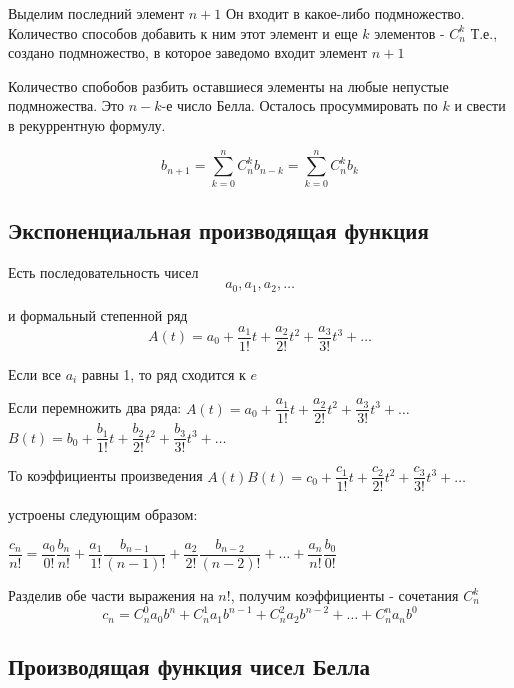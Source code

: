 Выделим последний элемент $ n+1 $
Он входит в какое-либо подмножество.
Количество способов добавить к ним этот элемент и еще $ k $ элементов - $ C_{n}^{k} $
Т.е., создано подмножество, в которое заведомо входит элемент $ n+1 $

Количество спобобов разбить оставшиеся элементы на любые непустые подмножества.
Это $ n-k$-е число Белла.
Осталось просуммировать по $ k $ и свести в рекуррентную формулу.

\begin{equation}
\label{bell_recur}
b_{n+1} = \sum\limits_{k = 0}^{n} C_{n}^{k} b_{n-k} = \sum\limits_{k = 0}^{n} C_{n}^{k} b_{k} 
\end{equation}

\subsection{Экспоненциальная производящая функция}

Есть последовательность чисел
$$
a_0, a_1, a_2, \ldots 
$$

и формальный степенной ряд
$$
A(t) = a_0 + \dfrac{a_1}{1!}t + \dfrac{a_2}{2!}t^{2} + \dfrac{a_3}{3!}t^{3} +\ldots 
$$

Если все $ a_i $ равны 1, то ряд сходится к $ e $

Если перемножить два ряда:
$A(t) = a_0 + \dfrac{a_1}{1!}t + \dfrac{a_2}{2!}t^{2} + \dfrac{a_3}{3!}t^{3} +\ldots $
$B(t) = b_0 + \dfrac{b_1}{1!}t + \dfrac{b_2}{2!}t^{2} + \dfrac{b_3}{3!}t^{3} +\ldots $

То коэффициенты произведения
$A(t) B(t) = c_0 + \dfrac{c_1}{1!}t + \dfrac{c_2}{2!}t^{2} + \dfrac{c_3}{3!}t^{3} +\ldots $

устроены следующим образом:

$\dfrac{c_n}{n!} = \dfrac{a_{0}}{0!}\dfrac{b_{n}}{n!}
+ \dfrac{a_{1}}{1!} \dfrac{b_{n-1}}{(n-1)!} 
+ \dfrac{a_{2}}{2!} \dfrac{b_{n-2}}{(n-2)!}
+ \ldots 
+ \dfrac{a_{n}}{n!} \dfrac{b_{0}}{0!} $

Разделив обе части выражения на $ n! $, получим коэффициенты - сочетания $C_{n}^{k}$
\begin{equation}
\label{exponent_gen_func}
{c_n} = C_{n}^{0} a_{0} b^{n} 
+ C_{n}^{1} a_{1} b^{n-1} 
+ C_{n}^{2} a_{2} b^{n-2} 
+ \ldots
+ C_{n}^{n} a_{n} b^{0} 
\end{equation}


\subsection{Производящая функция чисел Белла}

